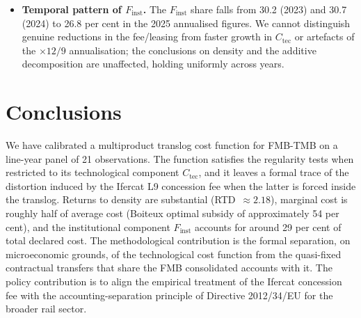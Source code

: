\documentclass[11pt,a4paper]{article}
\begin{document}
\begin{itemize}[leftmargin=*,topsep=2pt]
reliability are product dimensions the operator can adjust with inputs;
our model implicitly assumes quality moves proportionally with car-km
($Y_2$), so the reported returns to density should be read as conditional
on approximately constant service quality. As argued in
Section~\ref{sec:margins}, this does not affect the central conclusion on
$F_{\text{inst}}$: the concession fee is impermeable to all three genuine
substitution margins, so its exclusion from $C_{\text{tec}}$ is required
by the technology, not by the constant-quality assumption.
\item \textbf{Temporal pattern of $F_{\text{inst}}$.} The $F_{\text{inst}}$
share falls from 30.2 (2023) and 30.7 (2024) to 26.8 per cent in the 2025
annualised figures. We cannot distinguish genuine reductions in the
fee/leasing from faster growth in $C_{\text{tec}}$ or artefacts of the
$\times 12/9$ annualisation; the conclusions on density and the additive
decomposition are unaffected, holding uniformly across years.
\end{itemize}

\section{Conclusions}
\label{sec:concl}

We have calibrated a multiproduct translog cost function for FMB-TMB on
a line-year panel of 21 observations. The function satisfies the
regularity tests when restricted to its technological component
$C_{\text{tec}}$, and it leaves a formal trace of the distortion induced
by the Ifercat L9 concession fee when the latter is forced inside the
translog. Returns to density are substantial (RTD~$\approx 2.18$),
marginal cost is roughly half of average cost (Boiteux optimal subsidy
of approximately 54 per cent), and the institutional component
$F_{\text{inst}}$ accounts for around 29 per cent of total declared
cost. The methodological contribution is the formal separation, on
microeconomic grounds, of the technological cost function from the
quasi-fixed contractual transfers that share the FMB consolidated
accounts with it. The policy contribution is to align the empirical
treatment of the Ifercat concession fee with the accounting-separation
principle of Directive 2012/34/EU for the broader rail sector.
\end{document}
